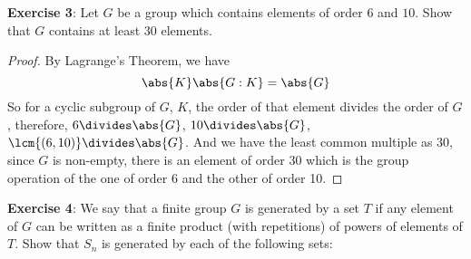 \documentclass{article}
\begin{document}
\textbf{Exercise 3}: Let $G$ be a group which contains elements of order $6$ and $10$. Show that $G$ contains at least $30$ elements.

\begin{proof}
	By Lagrange's Theorem, we have 
	\begin{equation*}
		\abs{K}\abs{G : K} = \abs{G}
	\end{equation*}
	So for a cyclic subgroup of $G$, $K$, the order of that element divides the order of $G$, therefore, $6 \divides \abs{G}$, $10 \divides \abs{G}$, $\lcm{(6,10)} \divides \abs{G}$. And we have the least common multiple as $30$, since $G$ is non-empty, there is an element of order 30 which is the group operation of the one of order 6 and the other of order 10.
\end{proof} 

\textbf{Exercise 4}: We say that a finite group $G$ is generated by a set $T$ if any element of $G$ can be written as a finite product (with repetitions) of powers of elements of $T$. Show that $S_{n}$ is generated by each of the following sets:
\end{document}
